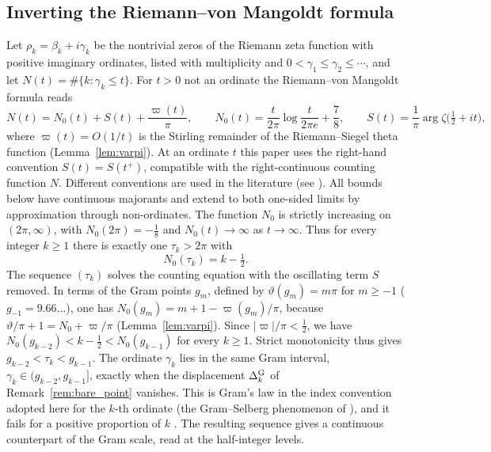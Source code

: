 \documentclass[11pt,a4paper]{article}
\makeatletter
\numberwithin{equation}{section}
\DeclareRobustCommand{\CGref}[1]{\ref{#1}}
\DeclareRobustCommand{\CGcite}[2][]{\if\relax\detokenize{#1}\relax\cite{#2}\else\cite[#1]{#2}\fi}
\let\CG@origref\ref
\newcommand{\CG@gettip}[1]{\@ifundefined{CGTip@#1}{#1}{\csname CGTip@#1\endcsname}}
\newcommand{\CG@getbib}[1]{\@ifundefined{CGBib@#1}{#1}{\csname CGBib@#1\endcsname}}
\DeclareRobustCommand{\CGref}[1]{\pdftooltip{\CG@origref{#1}}{\CG@gettip{#1}}}
\DeclareRobustCommand{\CGcite}[2][]{\pdftooltip{\if\relax\detokenize{#1}\relax\cite{#2}\else\cite[#1]{#2}\fi}{\CG@getbib{#2}}}
\theoremstyle{definition}
\theoremstyle{remark}
\newcommand{\Nz}{N_0} %
\makeatother
\begin{document}
\subsection{Inverting the Riemann--von Mangoldt formula}\label{subsec:tau_intro}
Let $\rho_k=\beta_k+i\gamma_k$ be the nontrivial zeros of the Riemann zeta function with positive imaginary ordinates, listed with multiplicity and $0<\gamma_1\le\gamma_2\le\cdots$, and let $N(t)=\#\{k:\gamma_k\le t\}$. For $t>0$ not an ordinate the Riemann--von Mangoldt formula reads \CGcite[\S9.3]{Titchmarsh1986}
\begin{equation}
N(t)=\Nz(t)+S(t)+\frac{\varpi(t)}\pi,\qquad \Nz(t)=\frac t{2\pi}\log\frac t{2\pi e}+\frac78,\qquad S(t)=\frac1\pi\arg\zeta\bigl(\tfrac12+it\bigr),
\label{eq:intro_RvM}
\end{equation}
where $\varpi(t)=O(1/t)$ is the Stirling remainder of the Riemann--Siegel theta function (Lemma~\CGref{lem:varpi}). At an ordinate $t$ this paper uses the right-hand convention $S(t)=S(t^+)$, compatible with the right-continuous counting function $N$. Different conventions are used in the literature (see \CGcite[\S9.3]{Titchmarsh1986}). All bounds below have continuous majorants and extend to both one-sided limits by approximation through non-ordinates. The function $\Nz$ is strictly increasing on $(2\pi,\infty)$, with $\Nz(2\pi)=-\frac18$ and $\Nz(t)\to\infty$ as $t\to\infty$. Thus for every integer $k\ge1$ there is exactly one $\tau_k>2\pi$ with
\begin{equation}
\Nz(\tau_k)=k-\tfrac12 .
\label{eq:intro_tau}
\end{equation}
The sequence $(\tau_k)$ solves the counting equation with the oscillating term $S$ removed. In terms of the Gram points $g_m$, defined by $\vartheta(g_m)=m\pi$ for $m\ge-1$ ($g_{-1}=9.66\ldots$), one has $\Nz(g_m)=m+1-\varpi(g_m)/\pi$, because $\vartheta/\pi+1=\Nz+\varpi/\pi$ (Lemma~\CGref{lem:varpi}). Since $|\varpi|/\pi<\frac12$, we have $\Nz(g_{k-2})<k-\frac12<\Nz(g_{k-1})$ for every $k\ge1$. Strict monotonicity thus gives $g_{k-2}<\tau_k<g_{k-1}$. The ordinate $\gamma_k$ lies in the same Gram interval, $\gamma_k\in(g_{k-2},g_{k-1}]$, exactly when the displacement $\Delta^{\rm G}_k$ of Remark~\CGref{rem:bare_point} vanishes. This is Gram's law in the index convention adopted here for the $k$-th ordinate (the Gram--Selberg phenomenon of \CGcite[Def.~1.4]{Korolev2012}), and it fails for a positive proportion of $k$ \CGcite[p.~58]{Korolev2012}. The resulting sequence gives a continuous counterpart of the Gram scale, read at the half-integer levels.
\end{document}
